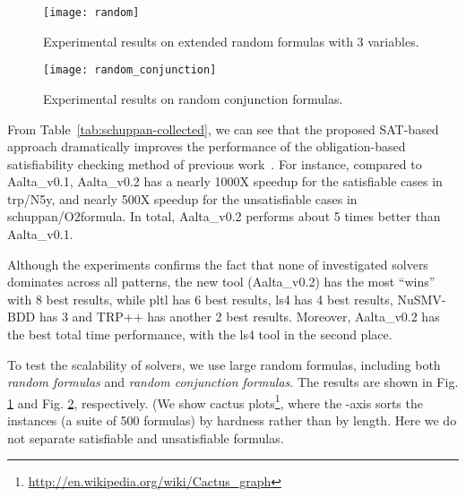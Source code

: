 \documentclass[conference]{IEEEtran}
\def\Aalta{{Aalta}}
\begin{document}
\begin{figure}
\centering
\texttt{[image: random]}
\caption{Experimental results on extended random formulas with 3 variables.}
\label{fig:random}
\end{figure}

\begin{figure}
\centering
\texttt{[image: random\_conjunction]}
\caption{Experimental results on random conjunction formulas.}
\label{fig:random_conjunction}
\end{figure}


From Table~\ref{tab:schuppan-collected}, we can see that the  proposed 
SAT-based approach dramatically improves the performance of the 
obligation-based satisfiability checking method of previous 
work~\cite{LZPVH13}. For instance, compared to \Aalta\_v0.1, \Aalta\_v0.2 
has a nearly 1000X speedup for the satisfiable cases in 
\textsf{trp/N5y}, and nearly 500X speedup for the unsatisfiable cases in
\textsf{schuppan/O2formula}. In total, \Aalta\_v0.2 performs about 5 times 
better than \Aalta\_v0.1.



Although the experiments confirms the fact that none of investigated solvers
dominates across all patterns, the new tool (\Aalta\_v0.2) has the most 
``wins'' with 8 best results, while pltl has 6 best results, ls4 has 4 best
results, NuSMV-BDD has 3 and TRP++ has another 2 best results. 
Moreover, \Aalta\_v0.2 has the best total time performance,
with the ls4 tool in the second place.


 

\iffalse
\begin{figure}[t]
\begin{minipage}[b]{0.45\linewidth}
\centering
\texttt{[image: polsat\_sat]}
\caption{Polsat improvement on extended satisfiable random formulas with 3 variables.}
\label{fig:polsat_sat}
\end{minipage}
\hspace{0.6cm}
\begin{minipage}[b]{0.45\linewidth}
\centering
\texttt{[image: polsat\_unsat]}
\caption{Polsat improvement on extended unsatisfiable random formulas with 3 variables.}
\label{fig:polsat_unsat}
\end{minipage}
\end{figure}
\fi

To test the scalability of solvers, we use large random formulas, 
including both \textit{random formulas} and 
\textit{random conjunction formulas}.
The results are shown in Fig. \ref{fig:random} and
Fig. \ref{fig:random_conjunction}, respectively. (We show cactus plots\footnote{\url{http://en.wikipedia.org/wiki/Cactus_graph}}, 
where the -axis sorts the instances (a suite of 500 formulas) by 
hardness rather than by length.
Here we do not separate satisfiable and unsatisfiable formulas.
\end{document}
